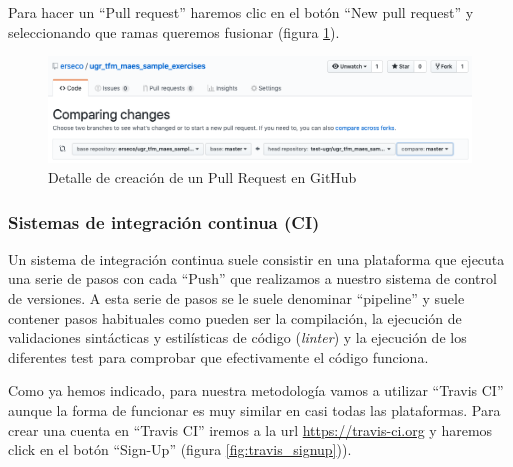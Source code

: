 Para hacer un ``Pull request'' haremos clic en el botón ``New pull request'' y seleccionando que ramas queremos fusionar (figura \ref{fig:git_pr}).

\begin{figure}[H]
\centering
\includegraphics[width=1.0\textwidth]{../images/git_pr}
\caption{Detalle de creación de un Pull Request en GitHub}
\label{fig:git_pr}
\end{figure}


\subsubsection{Sistemas de integración continua (CI)}

Un sistema de integración continua suele consistir en una plataforma que ejecuta una serie de pasos con cada ``Push'' que realizamos a nuestro sistema de control de versiones. A esta serie de pasos se le suele denominar ``pipeline'' y suele contener pasos habituales como pueden ser la compilación, la ejecución de validaciones sintácticas y estilísticas de código (\textit{linter}) y la ejecución de los diferentes test para comprobar que efectivamente el código funciona.

\bigskip
Como ya hemos indicado, para nuestra metodología vamos a utilizar ``Travis CI'' aunque la forma de funcionar es muy similar en casi todas las plataformas. Para crear una cuenta en ``Travis CI'' iremos a la url \url{https://travis-ci.org} y haremos click en el botón ``Sign-Up'' (figura \ref{fig:travis_signup})).

